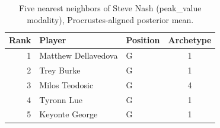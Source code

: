 \begin{table}[htbp]
  \centering\small
  \begin{tabular}{rllc}
    \toprule
    Rank & Player & Position & Archetype \\
    \midrule
    1 & Matthew Dellavedova & G & 1 \\
    2 & Trey Burke & G & 1 \\
    3 & Milos Teodosic & G & 4 \\
    4 & Tyronn Lue & G & 1 \\
    5 & Keyonte George & G & 1 \\
    \bottomrule
  \end{tabular}
  \caption{Five nearest neighbors of Steve Nash (peak_value modality), Procrustes-aligned posterior mean.}
  \label{tab:Steve_Nash_neighbors_peak_value}
\end{table}

